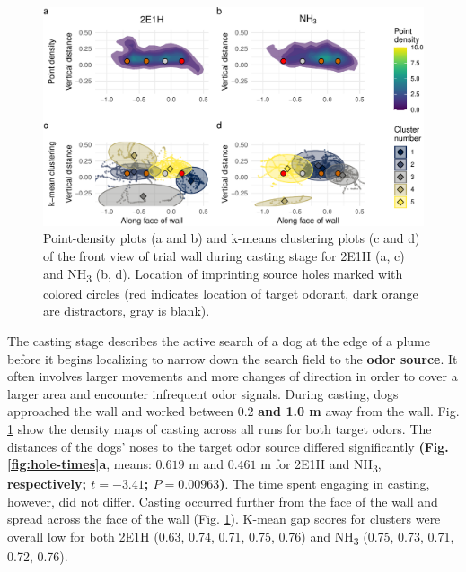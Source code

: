 \documentclass[
]{article}
\begin{document}
\begin{figure}
\centering
\includegraphics{main-manuscript_files/figure-latex/frontwall-casting-1.pdf}
\caption{\label{fig:frontwall-casting}Point-density plots (a and b) and k-means clustering plots (c and d) of the front view of trial wall during casting stage for 2E1H (a, c) and NH\textsubscript{3} (b, d). Location of imprinting source holes marked with colored circles (red indicates location of target odorant, dark orange are distractors, gray is blank).}
\end{figure}

The casting stage describes the active search of a dog at the edge of a plume before it begins localizing to narrow down the search field to the \textbf{odor source}. It often involves larger movements and more changes of direction in order to cover a larger area and encounter infrequent odor signals. During casting, dogs approached the wall and worked between 0.2 \textbf{and 1.0 m} away from the wall. Fig. \ref{fig:frontwall-casting} show the density maps of casting across all runs for both target odors. The distances of the dogs' noses to the target odor source differed significantly \textbf{(Fig. \ref{fig:hole-times}a}, means: \(0.619\) m and \(0.461\) m for 2E1H and NH\textsubscript{3}, \textbf{respectively; \(t = -3.41\); \(P = 0.00963\))}. The time spent engaging in casting, however, did not differ. Casting occurred further from the face of the wall and spread across the face of the wall (Fig. \ref{fig:frontwall-casting}). K-mean gap scores for clusters were overall low for both 2E1H (0.63, 0.74, 0.71, 0.75, 0.76) and NH\textsubscript{3} (0.75, 0.73, 0.71, 0.72, 0.76).
\end{document}

